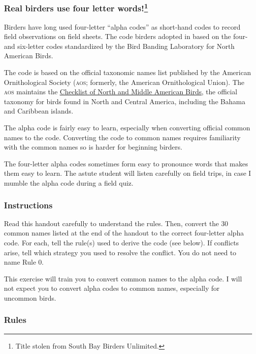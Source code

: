\documentclass[11pt]{article}
\begin{document}
\subsubsection*{Real birders use four letter words!\footnote{Title stolen from South Bay Birders Unlimited.}}

Birders have long used four-letter “alpha codes” as short-hand codes to record field observations on field sheets. The code birders adopted in based on the four- and six-letter codes standardized by the Bird Banding Laboratory for North American Birds. 

The code is based on the official taxonomic names list published by the American Ornithological Society (\textsc{aos;} formerly, the American Ornithological Union). The \textsc{aos} maintains the \href{http://checklist.americanornithology.org/}{\underline{Checklist of North and Middle American Birds}}, the official taxonomy for birds found in North and Central America, including the Bahama and Caribbean islands.

The alpha code is fairly easy to learn, especially when converting official common names to the code. Converting the code to common names requires familiarity with the common names so is harder for beginning birders. 

The four-letter alpha codes sometimes form easy to pronounce words that makes them easy to learn. The astute student will listen carefully on field trips, in case I mumble the alpha code during a field quiz.  

\subsubsection*{Instructions}

Read this handout carefully to understand the rules. Then, convert the 30 common names listed at the end of the handout to the correct four-letter alpha code. For each, tell the rule(s) used to derive the code (see below). If conflicts arise, tell which  strategy you used to resolve the conflict. You do not need to name Rule 0.

This exercise will train you to convert common names to the alpha code. I will not expect you to convert alpha codes to common names, especially for uncommon birds.

\subsubsection*{Rules}
\end{document}
